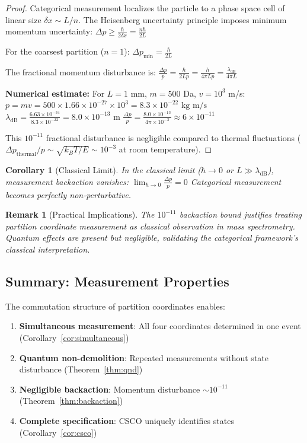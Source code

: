 \documentclass[twocolumn,10pt]{article}
\newtheorem{corollary}[theorem]{Corollary}
\newtheorem{remark}[theorem]{Remark}
\begin{document}
\begin{proof}
Categorical measurement localizes the particle to a phase space cell of linear size $\delta x \sim L/n$. The Heisenberg uncertainty principle imposes minimum momentum uncertainty:
$
\Delta p \geq \frac{\hbar}{2\delta x} = \frac{n\hbar}{2L}
$

For the coarsest partition ($n = 1$):
$
\Delta p_{\min} = \frac{\hbar}{2L}
$

The fractional momentum disturbance is:
$
\frac{\Delta p}{p} = \frac{\hbar}{2Lp} = \frac{h}{4\pi Lp} = \frac{\lambda_{\mathrm{dB}}}{4\pi L}
$

\textbf{Numerical estimate:} For $L = 1$ mm, $m = 500$ Da, $v = 10^3$ m/s:
$
p = mv = 500 \times 1.66 \times 10^{-27} \times 10^3 = 8.3 \times 10^{-22} \text{ kg m/s}
$
$
\lambda_{\mathrm{dB}} = \frac{6.63 \times 10^{-34}}{8.3 \times 10^{-22}} = 8.0 \times 10^{-13} \text{ m}
$
$
\frac{\Delta p}{p} = \frac{8.0 \times 10^{-13}}{4\pi \times 10^{-3}} \approx 6 \times 10^{-11}
$

This $10^{-11}$ fractional disturbance is negligible compared to thermal fluctuations ($\Delta p_{\mathrm{thermal}}/p \sim \sqrt{k_BT/E} \sim 10^{-3}$ at room temperature).
\end{proof}

\begin{corollary}[Classical Limit]
\label{cor:classical}
In the classical limit ($\hbar \to 0$ or $L \gg \lambda_{\mathrm{dB}}$), measurement backaction vanishes:
$
\lim_{\hbar \to 0} \frac{\Delta p}{p} = 0
$
Categorical measurement becomes perfectly non-perturbative.
\end{corollary}

\begin{remark}[Practical Implications]
The $10^{-11}$ backaction bound justifies treating partition coordinate measurement as \emph{classical observation} in mass spectrometry. Quantum effects are present but negligible, validating the categorical framework's classical interpretation.
\end{remark}

\subsection{Summary: Measurement Properties}

The commutation structure of partition coordinates enables:
\begin{enumerate}
    \item \textbf{Simultaneous measurement}: All four coordinates determined in one event (Corollary~\ref{cor:simultaneous})
    \item \textbf{Quantum non-demolition}: Repeated measurements without state disturbance (Theorem~\ref{thm:qnd})
    \item \textbf{Negligible backaction}: Momentum disturbance $\sim 10^{-11}$ (Theorem~\ref{thm:backaction})
    \item \textbf{Complete specification}: CSCO uniquely identifies states (Corollary~\ref{cor:csco})
\end{enumerate}
\end{document}

